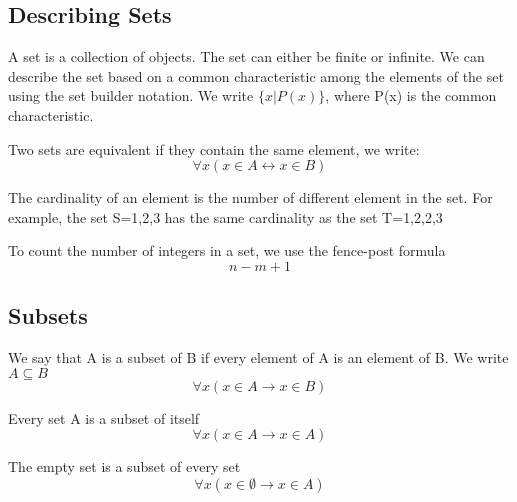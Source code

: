 \documentclass{article}
\begin{document}
\subsection{Describing Sets}

\begin{definition}[Set]
    A set is a collection of objects. The set can either be finite or infinite. We
    can describe the set based on a common characteristic among the elements of the
    set using the set builder notation. We write \(\{x|P(x)\}\), where P(x) is the common
    characteristic.
\end{definition}

\begin{definition}
    Two sets are equivalent if they contain the same element, we write:
    $$ \forall x(x \in A \leftrightarrow x \in B) $$
\end{definition}

\begin{definition}[Cardinality]
    The cardinality of an element is the number of different element in the set. For
    example, the set S={1,2,3} has the same cardinality as the set T={1,2,2,3}
\end{definition}

\begin{theorem}
    To count the number of integers in a set, we use the fence-post formula
    $$ n - m + 1 $$
\end{theorem}

\subsection{Subsets}

\begin{definition}[Subset]
    We say that A is a subset of B if every element of A is an element of B. We write
    \( A \subseteq B\)
    $$ \forall x(x \in A \rightarrow x \in B) $$
\end{definition}

\begin{theorem}
    Every set A is a subset of itself
    $$ \forall x(x \in A \rightarrow x \in A) $$
\end{theorem}

\begin{theorem}
    The empty set is a subset of every set
    $$ \forall x(x \in \emptyset \rightarrow x \in A) $$
\end{theorem}
\end{document}
